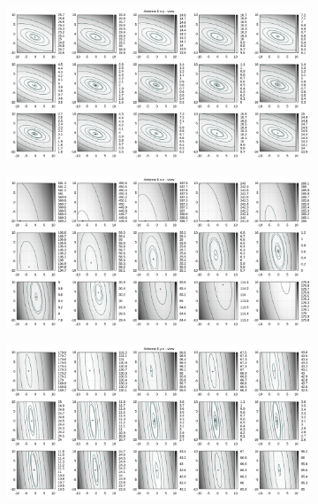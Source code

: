 \begin{appendix}
\begin{figure}[!ht]
\begin{subfigure}[t]{0.3\textwidth}
	\end{subfigure}
\\
	\centering
	\begin{subfigure}[t]{0.3\textwidth}
	     \centering
	     \includegraphics[width=\textwidth]{img/fitness/xy/a6.png}
	\end{subfigure}
	\begin{subfigure}[t]{0.3\textwidth}
		\centering
	     \includegraphics[width=\textwidth]{img/fitness/xz/a6.png}
	\end{subfigure}
	\begin{subfigure}[t]{0.3\textwidth}
			\centering
	   \includegraphics[width=\textwidth]{img/fitness/yz/a6.png}

\end{subfigure}
\end{figure}
\end{appendix}
